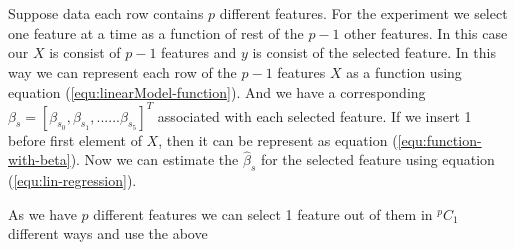 \documentclass[10pt,a4paper]{article}
\begin{document}
	\section{}
	Suppose data each row contains $p$ different features. For the experiment we select one feature at a time as a function of rest of the $p-1$ other features. In this case our $X$ is consist of $p-1$ features and $y$ is consist of the selected feature. In this way we can represent each row of the $p-1$ features $X$ as a function using equation  (\ref{equ:linearModel-function}). And we have a corresponding $\beta_s = [\beta_{s_0},\beta_{s_1},......\beta_{s_5}]^T$ associated with each selected feature. If we insert 1 before first element of $X$, then it can be represent as equation (\ref{equ:function-with-beta}). Now we can estimate the $\hat{\beta}_s$ for the selected feature using equation (\ref{equ:lin-regression}). 
	\par
	As we have $p$ different features we can select 1 feature out of them in $^pC_1$ different ways and use the above  
\end{document}
